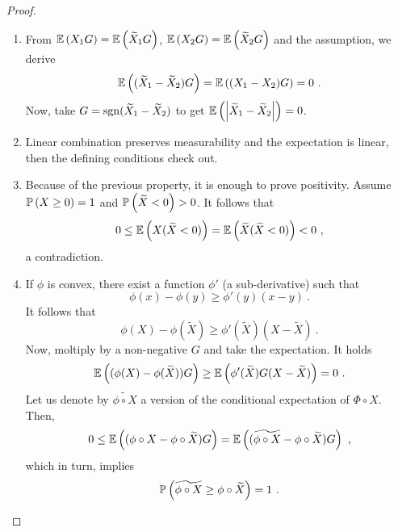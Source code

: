 \documentclass[12pt,a4paper]{amsart}
\theoremstyle{plain}%
\theoremstyle{definition}
\theoremstyle{remark}
\begin{document}
\begin{proof}
  \begin{enumerate}
  \item From $\operatorname{\mathbb E}\left(X_1G\right) = \operatorname{\mathbb E}\left(\widetilde X_1 G\right)$,
    $\operatorname{\mathbb E}\left(X_2G\right) = \operatorname{\mathbb E}\left(\widetilde X_2 G\right)$ and the
    assumption, we derive
    \begin{equation*}
      \operatorname{\mathbb E}\left((\widetilde X_1 - \widetilde X_2)G\right) =    \operatorname{\mathbb E}\left((
        X_1 - X_2)G\right) = 0 \ .
    \end{equation*}
Now, take $G = \operatorname{sgn}(\widetilde X_1 - \widetilde X_2)$ to get $
\operatorname{\mathbb E}\left(\left\vert\widetilde X_1 - \widetilde X_2\right\vert\right) = 0$. 
  \item Linear combination preserves measurability and the expectation
    is linear, then the defining conditions check out.  
  \item Because of the previous property, it is enough to prove
    positivity. Assume $\operatorname{\mathbb P}\left(X \geq 0\right) = 1$ and $\operatorname{\mathbb P}\left(\widetilde
      X < 0\right) > 0$. It follows that
    \begin{equation*}
      0 \leq \operatorname{\mathbb E}\left(X(\widetilde X < 0)\right) = \operatorname{\mathbb E}\left(\widetilde X
        (\widetilde X < 0)\right) < 0 \ ,
    \end{equation*}
a contradiction.
  \item If $\phi$ is convex, there exist a function $\phi'$ (a
    sub-derivative) such that
    \begin{equation*}
      \phi(x) - \phi(y) \geq \phi'(y) (x-y) \ .
    \end{equation*}
It follows that
    \begin{equation*}
     \phi(X) - \phi(\widetilde X) \geq \phi'(\widetilde X)
      (X-\widetilde X) \ .
    \end{equation*}
    Now, moltiply by a non-negative $G$ and take the expectation.  It holds
  \begin{equation*}
    \operatorname{\mathbb E}\left((\phi(X) - \phi(\widetilde X))G\right) \geq \operatorname{\mathbb E}\left(\phi'(\widetilde X)G
      (X-\widetilde X)\right) = 0 \ .
    \end{equation*}
Let us denote by $\widetilde{\phi\circ X}$ a version of the conditional
expectation of $\Phi\circ X$. Then,
\begin{equation*}
  0 \leq \expectof{(\phi\circ X - \phi \circ \widetilde X)G} =
  \expectof{(\widetilde{\phi\circ X} - \phi \circ \widetilde X)G} \ ,
\end{equation*}
which in turn, implies
\begin{equation*}
  \operatorname{\mathbb P}\left(\widetilde{\phi\circ X} \geq \phi \circ \widetilde X\right) = 1 \ .
\end{equation*}
  \end{enumerate}
\end{proof}
\end{document}

